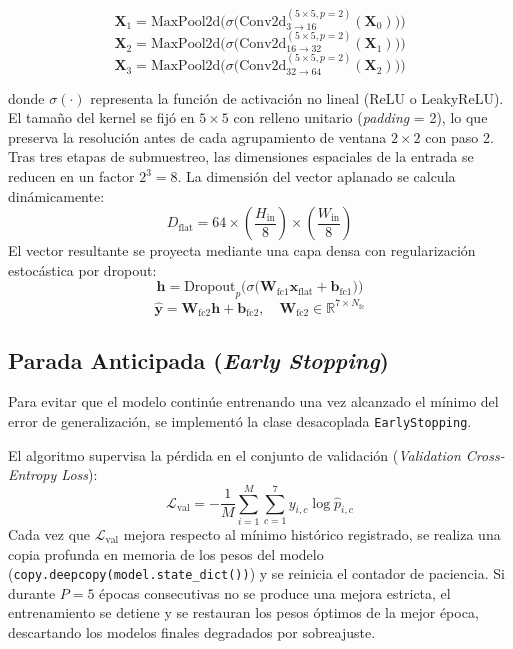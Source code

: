 \documentclass[11pt,a4paper]{article}
\begin{document}
\begin{equation}
    \mathbf{X}_1 = \text{MaxPool2d}\Big(\sigma\big(\text{Conv2d}_{3 \to 16}^{(5\times 5, p=2)}(\mathbf{X}_0)\big)\Big)
\end{equation}
\begin{equation}
    \mathbf{X}_2 = \text{MaxPool2d}\Big(\sigma\big(\text{Conv2d}_{16 \to 32}^{(5\times 5, p=2)}(\mathbf{X}_1)\big)\Big)
\end{equation}
\begin{equation}
    \mathbf{X}_3 = \text{MaxPool2d}\Big(\sigma\big(\text{Conv2d}_{32 \to 64}^{(5\times 5, p=2)}(\mathbf{X}_2)\big)\Big)
\end{equation}

donde $\sigma(\cdot)$ representa la función de activación no lineal (ReLU o LeakyReLU). El tamaño del kernel se fijó en $5\times 5$ con relleno unitario (\textit{padding} = 2), lo que preserva la resolución antes de cada agrupamiento de ventana $2\times 2$ con paso 2. Tras tres etapas de submuestreo, las dimensiones espaciales de la entrada se reducen en un factor $2^3 = 8$. La dimensión del vector aplanado se calcula dinámicamente:
\begin{equation}
    D_{\text{flat}} = 64 \times \left(\frac{H_{\text{in}}}{8}\right) \times \left(\frac{W_{\text{in}}}{8}\right)
\end{equation}
El vector resultante se proyecta mediante una capa densa con regularización estocástica por dropout:
\begin{equation}
    \mathbf{h} = \text{Dropout}_p\Big(\sigma\big(\mathbf{W}_{\text{fc1}} \mathbf{x}_{\text{flat}} + \mathbf{b}_{\text{fc1}}\big)\Big)
\end{equation}
\begin{equation}
    \hat{\mathbf{y}} = \mathbf{W}_{\text{fc2}} \mathbf{h} + \mathbf{b}_{\text{fc2}}, \quad \mathbf{W}_{\text{fc2}} \in \mathbb{R}^{7 \times N_{\text{fc}}}
\end{equation}

\subsection{Parada Anticipada (\textit{Early Stopping})}
Para evitar que el modelo continúe entrenando una vez alcanzado el mínimo del error de generalización, se implementó la clase desacoplada \texttt{EarlyStopping}. 

El algoritmo supervisa la pérdida en el conjunto de validación (\textit{Validation Cross-Entropy Loss}):
\begin{equation}
    \mathcal{L}_{\text{val}} = -\frac{1}{M} \sum_{i=1}^M \sum_{c=1}^7 y_{i,c} \log \hat{p}_{i,c}
\end{equation}
Cada vez que $\mathcal{L}_{\text{val}}$ mejora respecto al mínimo histórico registrado, se realiza una copia profunda en memoria de los pesos del modelo (\texttt{copy.deepcopy(model.state\_dict())}) y se reinicia el contador de paciencia. Si durante $P = 5$ épocas consecutivas no se produce una mejora estricta, el entrenamiento se detiene y se restauran los pesos óptimos de la mejor época, descartando los modelos finales degradados por sobreajuste.
\end{document}
